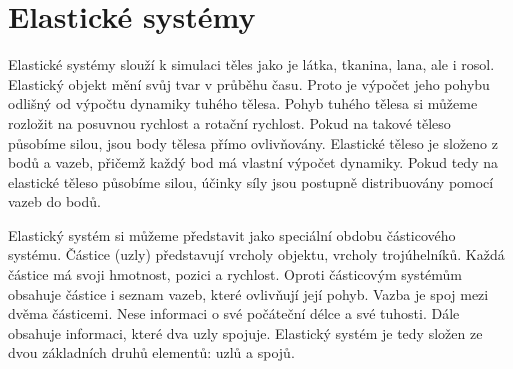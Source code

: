 
\section{Elastické systémy}
\label{sec:elastic}
Elastické systémy slouží k simulaci těles jako je látka, tkanina, lana, ale i rosol.
Elastický objekt mění svůj tvar v průběhu času.
Proto je výpočet jeho pohybu odlišný od výpočtu dynamiky tuhého tělesa.
Pohyb tuhého tělesa si můžeme rozložit na posuvnou rychlost a rotační rychlost.
Pokud na takové těleso působíme silou, jsou body tělesa přímo ovlivňovány.
Elastické těleso je složeno z bodů a vazeb, přičemž každý bod má vlastní výpočet dynamiky.
Pokud tedy na elastické těleso působíme silou, účinky síly jsou postupně distribuovány pomocí vazeb do bodů.

Elastický systém si můžeme představit jako speciální obdobu částicového systému.
Částice (uzly) představují vrcholy objektu, vrcholy trojúhelníků.
Každá částice má svoji hmotnost, pozici a rychlost.
Oproti částicovým systémům obsahuje částice i seznam vazeb, které ovlivňují její pohyb.
Vazba je spoj mezi dvěma částicemi.
Nese informaci o své počáteční délce a své tuhosti.
Dále obsahuje informaci, které dva uzly spojuje.
Elastický systém je tedy složen ze dvou základních druhů elementů: uzlů a spojů.

